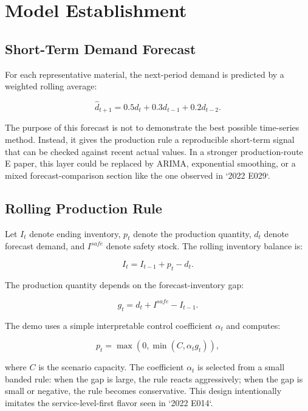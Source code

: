 \section{Model Establishment}

\subsection{Short-Term Demand Forecast}

For each representative material, the next-period demand is predicted by a weighted rolling average:

\begin{equation}
\hat d_{t+1}=0.5d_t+0.3d_{t-1}+0.2d_{t-2}.
\end{equation}

The purpose of this forecast is not to demonstrate the best possible time-series method. Instead, it gives the production rule a reproducible short-term signal that can be checked against recent actual values. In a stronger production-route E paper, this layer could be replaced by ARIMA, exponential smoothing, or a mixed forecast-comparison section like the one observed in `2022 E029`.

\subsection{Rolling Production Rule}

Let $I_t$ denote ending inventory, $p_t$ denote the production quantity, $d_t$ denote forecast demand, and $I^{safe}$ denote safety stock. The rolling inventory balance is:

\begin{equation}
I_t = I_{t-1}+p_t-d_t.
\end{equation}

The production quantity depends on the forecast-inventory gap:

\begin{equation}
g_t=d_t+I^{safe}-I_{t-1}.
\end{equation}

The demo uses a simple interpretable control coefficient $\alpha_t$ and computes:

\begin{equation}
p_t=\max(0,\min(C,\alpha_t g_t)),
\end{equation}

where $C$ is the scenario capacity. The coefficient $\alpha_t$ is selected from a small banded rule: when the gap is large, the rule reacts aggressively; when the gap is small or negative, the rule becomes conservative. This design intentionally imitates the service-level-first flavor seen in `2022 E014`.

